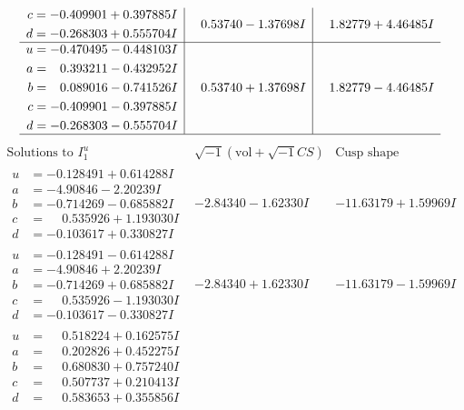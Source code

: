\documentclass[1p]{elsarticle_modified}
\theoremstyle{definition}
\newcommand{\I}{\sqrt{-1}}
\begin{document}
$$\begin{array}{c|c|c}
\begin{aligned}
c &= -0.409901 + 0.397885 I \\
d &= -0.268303 + 0.555704 I\end{aligned}
 & \phantom{-}0.53740 - 1.37698 I & \phantom{-}1.82779 + 4.46485 I \\ \hline\begin{aligned}
u &= -0.470495 - 0.448103 I \\
a &= \phantom{-}0.393211 - 0.432952 I \\
b &= \phantom{-}0.089016 - 0.741526 I \\
c &= -0.409901 - 0.397885 I \\
d &= -0.268303 - 0.555704 I\end{aligned}
 & \phantom{-}0.53740 + 1.37698 I & \phantom{-}1.82779 - 4.46485 I\\
 \hline 
 \end{array}$$\newpage$$\begin{array}{c|c|c}  
\text{Solutions to }I^u_{1}& \I (\text{vol} + \sqrt{-1}CS) & \text{Cusp shape}\\
 \hline 
\begin{aligned}
u &= -0.128491 + 0.614288 I \\
a &= -4.90846 - 2.20239 I \\
b &= -0.714269 - 0.685882 I \\
c &= \phantom{-}0.535926 + 1.193030 I \\
d &= -0.103617 + 0.330827 I\end{aligned}
 & -2.84340 - 1.62330 I & -11.63179 + 1.59969 I \\ \hline\begin{aligned}
u &= -0.128491 - 0.614288 I \\
a &= -4.90846 + 2.20239 I \\
b &= -0.714269 + 0.685882 I \\
c &= \phantom{-}0.535926 - 1.193030 I \\
d &= -0.103617 - 0.330827 I\end{aligned}
 & -2.84340 + 1.62330 I & -11.63179 - 1.59969 I \\ \hline\begin{aligned}
u &= \phantom{-}0.518224 + 0.162575 I \\
a &= \phantom{-}0.202826 + 0.452275 I \\
b &= \phantom{-}0.680830 + 0.757240 I \\
c &= \phantom{-}0.507737 + 0.210413 I \\
d &= \phantom{-}0.583653 + 0.355856 I\end{aligned}

\end{array}$$
\end{document}
